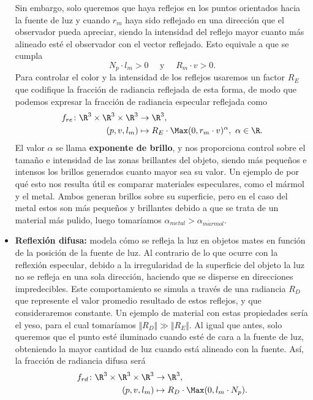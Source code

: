 \begin{itemize}
    Sin embargo, solo queremos que haya reflejos en los puntos orientados hacia la fuente de luz y cuando $r_m$ haya sido reflejado en una dirección que el observador pueda apreciar, siendo la intensidad del reflejo mayor cuanto más alineado esté el observador con el vector reflejado. Esto equivale a que se cumpla
    \begin{equation*}
        N_p\cdot l_m >0 \quad \text{ y }\quad  R_m \cdot v>0.
    \end{equation*}
    Para controlar el color y la intensidad de los reflejos usaremos un factor $R_E$ que codifique la fracción de radiancia reflejada de esta forma, de modo que podemos expresar la fracción de radiancia especular reflejada como
    \begin{align*}
        f_{re} \colon \R^3\times \R^3\times \R^3 &\to \R^3,\\
        (p,v,l_m) &\mapsto R_E \cdot \Max(0,r_m \cdot v)^{\alpha},\ \alpha\in \R.
    \end{align*}
    El valor $\alpha$ se llama \textbf{exponente de brillo}, y nos proporciona control sobre el tamaño e intensidad de las zonas brillantes del objeto, siendo más pequeños e intensos los brillos generados cuanto mayor sea su valor. Un ejemplo de por qué esto nos resulta útil es comparar materiales especulares, como el mármol y el metal. Ambos generan brillos sobre su superficie, pero en el caso del metal estos son más pequeños y brillantes debido a que se trata de un material más pulido, luego tomaríamos $\alpha_{metal} > \alpha_{m\acute{a}rmol}$. 
    \item \textbf{Reflexión difusa:} modela cómo se refleja la luz en objetos mates en función de la posición de la fuente de luz. Al contrario de lo que ocurre con la reflexión especular, debido a la irregularidad de la superficie del objeto la luz no se refleja en una sola dirección, haciendo que se disperse en direcciones impredecibles. Este comportamiento se simula a través de una radiancia $R_D$ que represente el valor promedio resultado de estos reflejos, y que consideraremos constante. Un ejemplo de material con estas propiedades sería el yeso, para el cual tomaríamos $\Vert R_D\Vert \gg \Vert R_E\Vert$.  Al igual que antes, solo queremos que el punto esté iluminado cuando esté de cara a la fuente de luz, obteniendo la mayor cantidad de luz cuando está alineado con la fuente. Así, la fracción de radiancia difusa será
    \begin{align*}
        f_{rd} \colon \R^3\times \R^3\times \R^3 &\to \R^3,\\
        (p,v,l_m) &\mapsto R_D\cdot \Max(0,l_m \cdot N_p).
    \end{align*}
\end{itemize}


